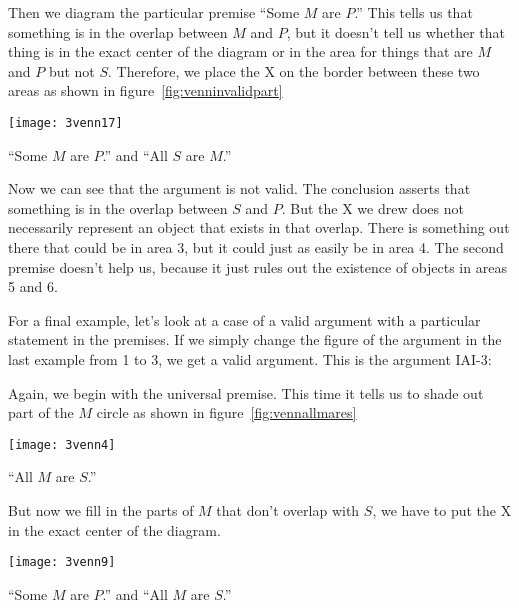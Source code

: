 Then we diagram the particular premise ``Some $M$ are $P$.'' This tells us that something is in the overlap between $M$ and $P$, but it doesn't tell us whether that thing is in the exact center of the diagram or in the area for things that are $M$ and $P$ but not $S$. Therefore, we place the X on the border between these two areas as shown in figure~\ref{fig:venninvalidpart}

\begin{marginfigure}
\texttt{[image: 3venn17]}
\caption{``Some $M$ are $P$.'' and ``All $S$ are $M$.''}
\label{fig:venninvalidpart}
\end{marginfigure}

Now we can see that the argument is not valid. The conclusion asserts that something is in the overlap between $S$ and $P$. But the X we drew does not necessarily represent an object that exists in that overlap. There is something out there that could be in area 3, but it could just as easily be in area 4. The second premise doesn't help us, because it just rules out the existence of objects in areas 5 and 6.

For a final example, let's look at a case of a valid argument with a particular statement in the premises. If we simply change the figure of the argument in the last example from 1 to 3, we get a valid argument. This is the argument IAI-3:

\begin{kormanize}
\end{kormanize}

Again, we begin with the universal premise. This time it tells us to shade out part of the $M$ circle as shown in figure~\ref{fig:vennallmares}

\begin{marginfigure}
\texttt{[image: 3venn4]}
\caption{``All $M$ are $S$.''}
\label{fig:vennallmares}
\end{marginfigure}

But now we fill in the parts of $M$ that don't overlap with $S$, we have to put the X in the exact center of the diagram.

\begin{marginfigure}
\texttt{[image: 3venn9]}
\caption{``Some $M$ are $P$.'' and ``All $M$ are $S$.''}
\label{fig:vennvalidpart}
\end{marginfigure}

